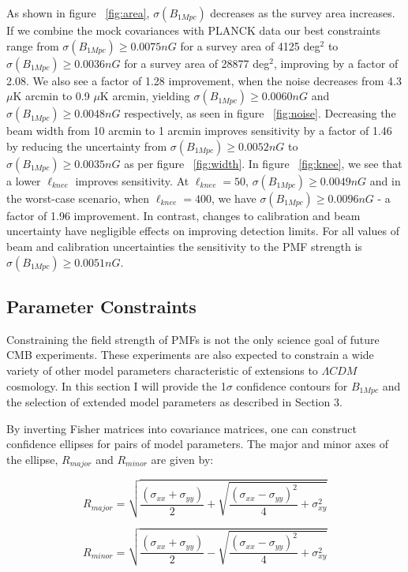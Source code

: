 As shown in figure ~\ref{fig:area}, $\sigma(B_{1Mpc})$ decreases as the survey area increases. If we combine the mock covariances with PLANCK data our best constraints range from $\sigma(B_{1Mpc}) \geq 0.0075nG$ for a survey area of 4125 deg$^2$ to $\sigma(B_{1Mpc}) \geq 0.0036nG$ for a survey area of 28877 deg$^2$, improving by a factor of 2.08. We also see a factor of 1.28 improvement, when the noise decreases from 4.3 $\mu$K arcmin to 0.9 $\mu$K arcmin, yielding  $\sigma(B_{1Mpc}) \geq 0.0060nG$ and $\sigma(B_{1Mpc}) \geq 0.0048nG$ respectively, as seen in figure ~\ref{fig:noise}. Decreasing the beam width from 10 arcmin to 1 arcmin improves sensitivity by a factor of 1.46 by reducing the uncertainty from $\sigma(B_{1Mpc}) \geq 0.0052nG$ to $\sigma(B_{1Mpc}) \geq 0.0035nG$ as per figure ~\ref{fig:width}. In figure ~\ref{fig:knee}, we see that a lower $\ell_{knee}$ improves sensitivity. At $\ell_{knee} = 50$, $\sigma(B_{1Mpc}) \geq 0.0049nG$ and in the worst-case scenario, when $\ell_{knee} = 400$, we have $\sigma(B_{1Mpc}) \geq 0.0096nG$ - a factor of 1.96 improvement. In contrast, changes to calibration and beam uncertainty have negligible effects on improving detection limits. For all values of beam and calibration uncertainties the sensitivity to the PMF strength is $\sigma(B_{1Mpc}) \geq 0.0051nG$.

\pagebreak
\subsection{Parameter Constraints}

Constraining the field strength of PMFs is not the only science goal of future CMB experiments. These experiments are also expected to constrain a wide variety of other model parameters characteristic of extensions to $\Lambda CDM$ cosmology. In this section I will provide the 1$\sigma$ confidence contours for $B_{1Mpc}$ and the selection of extended model parameters as described in Section 3.

By inverting Fisher matrices into covariance matrices, one can construct confidence ellipses for pairs of model parameters. The major and minor axes of the ellipse, $R_{major}$ and $R_{minor}$ are given by:

\begin{equation}
R_{major} = \sqrt{\frac{(\sigma_{xx} + \sigma_{yy})}{2} + \sqrt{\frac{(\sigma_{xx} - \sigma_{yy})^2}{4} + \sigma_{xy}^2}}
\end{equation}

\begin{equation}
R_{minor} = \sqrt{\frac{(\sigma_{xx} + \sigma_{yy})}{2} - \sqrt{\frac{(\sigma_{xx} - \sigma_{yy})^2}{4} + \sigma_{xy}^2}}
\end{equation}

